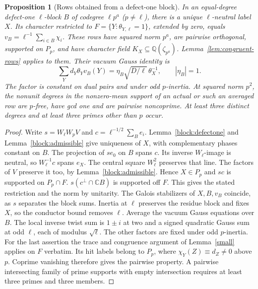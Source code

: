 \documentclass[11pt]{amsart}
\numberwithin{equation}{section}
\newtheorem{proposition}[theorem]{Proposition}
\theoremstyle{definition}
\theoremstyle{plain}
\newcommand{\QQ}{\mathbb Q}
\begin{document}
\begin{proposition}[Rows obtained from a defect-one block]\label{result:effective}
In an equal-degree defect-one $\ell$-block $B$ of codegree $\ell p^a$
($p\ne\ell$), there is a unique $\ell$-neutral label $X$. Its character
restricted to $F=\{Y:\theta_{Y,\ell}=1\}$, extended by zero, equals
$v_B=\ell^{-1}\sum_{i\in B}\chi_i$. These rows have squared norm $p^a$,
are pairwise orthogonal, supported on $P_p$, and have character field
$K_X\subseteq\QQ(\zeta_{p^a})$. Lemma~\ref{lem:congruent-rows}
applies to them. Their vacuum Gauss identity is
\begin{equation}
\sum_Yd_Y\theta_Yv_B(Y)=\eta_B\sqrt{D/\ell}\,\theta_X^{-1},
\qquad |\eta_B|=1 .
\end{equation}
The factor is constant on dual pairs and under odd $p$-inertia.
At squared norm $p^2$, the nonunit degrees in the nonzero-mean
support of an actual or such an averaged row are $p$-free, have gcd
one and are pairwise noncoprime. At least three distinct degrees
and at least three primes other than $p$ occur.
\end{proposition}
\begin{proof}
Write $s=W_\ell W_pV$ and $c=\ell^{-1/2}\sum_Be_i$.
Lemma~\ref{block:defectone} and Lemma~\ref{block:admissible} give uniqueness
of $X$, with complementary phases constant on $B$. The projection
of $se_0$ on $B$ spans $c$. Its inverse $W_\ell$-image is neutral,
so $W_\ell^{-1}c$ spans $e_X$. The central square $W_\ell^2$ preserves
that line. The factors of $V$ preserve it too, by
Lemma~\ref{block:admissible}. Hence $X\in P_p$ and $sc$ is supported
on $P_p\cap F$. $s(c^\perp\cap\mathbb C B)$ is supported off $F$.
This gives the stated restriction and the norm by unitarity.
The Galois stabilizers of $X,B,v_B$ coincide, as $s$ separates
the block sums. Inertia at $\ell$ preserves the residue block and
fixes $X$, so the conductor bound removes $\ell$. Average the vacuum
Gauss equations over $B$. The local inverse twist sum is $1\pm i$
at two and a signed quadratic Gauss sum at odd $\ell$, each of modulus
$\sqrt\ell$. The other factors are fixed under odd $p$-inertia.
For the last assertion the trace and congruence argument of
Lemma~\ref{small} applies on $F$ verbatim. Its hit labels
belong to $P_p$, where $\chi_Y(Z)\equiv d_Z\ne0$ above $p$.
Coprime vanishing therefore gives the pairwise property. A pairwise
intersecting family of prime supports with empty intersection requires
at least three primes and three members.
\end{proof}
\end{document}
